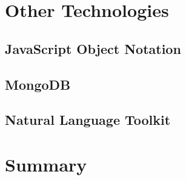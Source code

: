 \section{Other Technologies}

\subsection{JavaScript Object Notation}

\subsection{MongoDB}
\subsection{Natural Language Toolkit}


\section{Summary}



